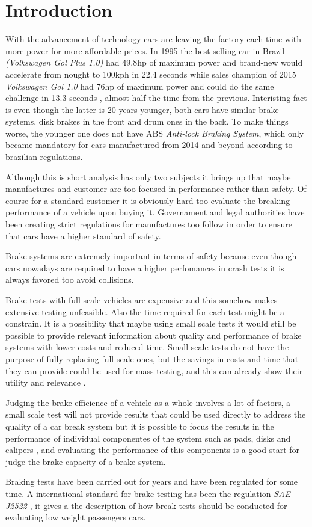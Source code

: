 \chapter{Introduction}

	With the advancement of technology cars are leaving the factory each time with more power for more affordable prices. In 1995 the best-selling car in Brazil \cite{lideres-vendas-brasil} \textit{(Volkswagen Gol Plus 1.0)} had 49.8hp of maximum power and brand-new would accelerate from nought to 100kph in 22.4 seconds \cite{cnwgol1993} while sales champion of 2015 \textit{Volkswagen Gol 1.0} had 76hp of maximum power and could do the same challenge in 13.3 seconds \cite{cnwgol2013}, almost half the time from the previous. Interisting fact is even though the latter is 20 years younger, both cars have similar brake systems, disk brakes in the front and drum ones in the back. To make things worse, the younger one does not have ABS \textit{Anti-lock Braking System}, which only became mandatory for cars manufactured from 2014 and beyond according to brazilian regulations.
	\par
	Although this is short analysis has only two subjects it brings up that maybe manufactures and customer are too focused in performance rather than safety. Of course for a standard customer it is obviously hard too evaluate the breaking performance of a vehicle upon buying it. Governament and legal authorities have been creating strict regulations for manufactures too follow in order to ensure that cars have a higher standard of safety.
	\par
	Brake systems are extremely important in terms of safety because even though cars nowadays are required to have a higher perfomances in crash tests it is always favored too avoid collisions.
	\par
	Brake tests with full scale vehicles are expensive and this somehow makes extensive testing unfeasible. Also the time required for each test might be a constrain. It is a possibility that maybe using small scale tests it would still be possible to provide relevant information about quality and performance of brake systems with lower costs and reduced time. Small scale tests do not have the purpose of fully replacing full scale ones, but the savings in costs and time that they can provide could be used for mass testing, and this can already show their utility and relevance \cite{gardinalli2005comparaccao}. 
	\par
	Judging the brake efficience of a vehicle as a whole involves a lot of factors, a small scale test will not provide results that could be used directly to address the quality of a car break system but it is possible to focus the results in the performance of individual componentes of the system such as pads, disks and calipers \cite{halderman2016automotive}, and evaluating the performance of this components is a good start for judge the brake capacity of a brake system.
	\par
	Braking tests have been carried out for years and have been regulated for some time. A international standard for brake testing has been the regulation \textit{SAE J2522} \cite{sae}, it gives a the description of how break tests should be conducted for evaluating low weight passengers cars.


